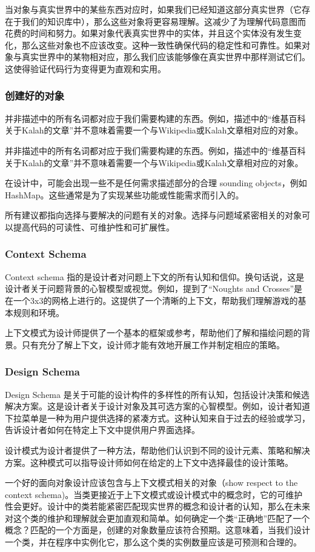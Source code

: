 \documentclass[]{ctexbook}
\begin{document}
当对象与真实世界中的某些东西对应时，如果我们已经知道这部分真实世界（它存在于我们的知识库中），那么这些对象将更容易理解。这减少了为理解代码意图而花费的时间和努力。如果对象代表真实世界中的实体，并且这个实体没有发生变化，那么这些对象也不应该改变。这种一致性确保代码的稳定性和可靠性。如果对象与真实世界中的某物相对应，那么我们应该能够像在真实世界中那样测试它们。这使得验证代码行为变得更为直观和实用。

\subsubsection{创建好的对象}
并非描述中的所有名词都对应于我们需要构建的东西。例如，描述中的“维基百科关于Kalah的文章”并不意味着需要一个与Wikipedia或Kalah文章相对应的对象。

并非描述中的所有名词都对应于我们需要构建的东西。例如，描述中的“维基百科关于Kalah的文章”并不意味着需要一个与Wikipedia或Kalah文章相对应的对象。

在设计中，可能会出现一些不是任何需求描述部分的合理 sounding objects，例如HashMap。这些通常是为了实现某些功能或性能需求而引入的。

所有建议都指向选择与要解决的问题有关的对象。选择与问题域紧密相关的对象可以提高代码的可读性、可维护性和可扩展性。

\subsubsection{Context Schema}
Context schema 指的是设计者对问题上下文的所有认知和信仰。换句话说，这是设计者关于问题背景的心智模型或视觉。例如，提到了“Noughts and Crosses”是在一个3x3的网格上进行的。这提供了一个清晰的上下文，帮助我们理解游戏的基本规则和环境。

上下文模式为设计师提供了一个基本的框架或参考，帮助他们了解和描绘问题的背景。只有充分了解上下文，设计师才能有效地开展工作并制定相应的策略。
\subsubsection{Design Schema}
Design Schema 是关于可能的设计构件的多样性的所有认知，包括设计决策和候选解决方案。这是设计者关于设计对象及其可选方案的心智模型。例如，设计者知道下拉菜单是一种为用户提供选择的紧凑方式。这种认知来自于过去的经验或学习，告诉设计者如何在特定上下文中提供用户界面选择。

设计模式为设计者提供了一种方法，帮助他们认识到不同的设计元素、策略和解决方案。这种模式可以指导设计师如何在给定的上下文中选择最佳的设计策略。

一个好的面向对象设计应该包含与上下文模式相关的对象（show respect to the context schema)。当类更接近于上下文模式或设计模式中的概念时，它的可维护性会更好。设计中的类若能紧密匹配现实世界的概念和设计者的认知，那么在未来对这个类的维护和理解就会更加直观和简单。如何确定一个类“正确地”匹配了一个概念？匹配的一个方面是，创建的对象数量应该符合预期。这意味着，当我们设计一个类，并在程序中实例化它，那么这个类的实例数量应该是可预测和合理的。
\end{document}
